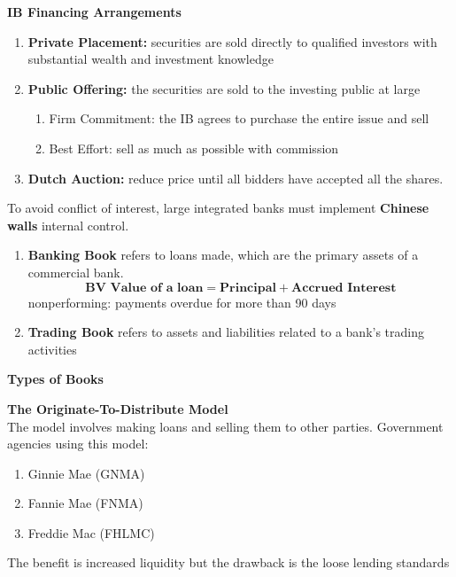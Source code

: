 \documentclass[11pt,fleqn]{book} %
\numberwithin{equation}{section} %
\numberwithin{figure}{section} %
\numberwithin{table}{section} %
\begin{document}
\begin{definition}\textbf{IB Financing Arrangements}
\begin{enumerate}
    \item \textbf{Private Placement:} securities are sold directly to qualified investors with substantial wealth and investment knowledge
    \item \textbf{Public Offering:} the securities are sold to the investing public at large
    \begin{enumerate}
        \item Firm Commitment: the IB agrees to purchase the entire issue and sell
        \item Best Effort: sell as much as possible with commission
    \end{enumerate}
    \item \textbf{Dutch Auction:} reduce price until all bidders have accepted all the shares.
\end{enumerate}
\end{definition}
\begin{remark}
To avoid conflict of interest, large integrated banks must implement \textbf{Chinese walls} internal control.
\end{remark}
\begin{definition}
\begin{enumerate}
    \item \textbf{Banking Book} refers to loans made, which are the primary assets of a commercial bank.
    $$
    \textbf{BV Value of a loan}=\textbf{Principal}+\textbf{Accrued Interest}
    $$
    nonperforming: payments overdue for more than 90 days
    \item \textbf{Trading Book} refers to assets and liabilities related to a bank's trading activities
\end{enumerate}
\end{definition}\textbf{Types of Books}

\begin{definition}\textbf{The Originate-To-Distribute Model}\\
The model involves making loans and selling them to other parties. Government agencies using this model:
\begin{enumerate}
    \item Ginnie Mae (GNMA)
    \item Fannie Mae (FNMA)
    \item Freddie Mac (FHLMC)
\end{enumerate}
The benefit is increased liquidity but the drawback is the loose lending standards
\end{definition}
\end{document}

